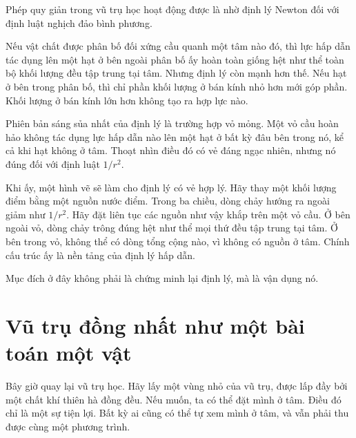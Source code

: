 Phép quy giản trong vũ trụ học hoạt động được là nhờ định lý Newton đối với định luật nghịch đảo bình phương.

Nếu vật chất được phân bố đối xứng cầu quanh một tâm nào đó, thì lực hấp dẫn tác dụng lên một hạt ở bên ngoài phân bố ấy hoàn toàn giống hệt như thể toàn bộ khối lượng đều tập trung tại tâm. Nhưng định lý còn mạnh hơn thế. Nếu hạt ở bên trong phân bố, thì chỉ phần khối lượng ở bán kính nhỏ hơn mới góp phần. Khối lượng ở bán kính lớn hơn không tạo ra hợp lực nào.

Phiên bản sáng sủa nhất của định lý là trường hợp vỏ mỏng. Một vỏ cầu hoàn hảo không tác dụng lực hấp dẫn nào lên một hạt ở bất kỳ đâu bên trong nó, kể cả khi hạt không ở tâm. Thoạt nhìn điều đó có vẻ đáng ngạc nhiên, nhưng nó đúng đối với định luật \(1/r^2\).

\begin{classroomqa}
\end{classroomqa}

Khi ấy, một hình vẽ sẽ làm cho định lý có vẻ hợp lý. Hãy thay một khối lượng điểm bằng một nguồn nước điểm. Trong ba chiều, dòng chảy hướng ra ngoài giảm như \(1/r^2\). Hãy đặt liên tục các nguồn như vậy khắp trên một vỏ cầu. Ở bên ngoài vỏ, dòng chảy trông đúng hệt như thể mọi thứ đều tập trung tại tâm. Ở bên trong vỏ, không thể có dòng tổng cộng nào, vì không có nguồn ở tâm. Chính cấu trúc ấy là nền tảng của định lý hấp dẫn.

Mục đích ở đây không phải là chứng minh lại định lý, mà là vận dụng nó.

\section{Vũ trụ đồng nhất như một bài toán một vật}

Bây giờ quay lại vũ trụ học. Hãy lấy một vùng nhỏ của vũ trụ, được lấp đầy bởi một chất khí thiên hà đồng đều. Nếu muốn, ta có thể đặt mình ở tâm. Điều đó chỉ là một sự tiện lợi. Bất kỳ ai cũng có thể tự xem mình ở tâm, và vẫn phải thu được cùng một phương trình.

